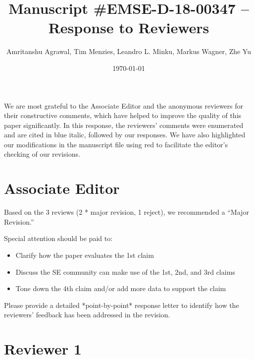 \documentclass{article}
\title{Manuscript \#EMSE-D-18-00347 -- Response to Reviewers}
\author{Amritanshu Agrawal, Tim Menzies, Leandro L. Minku, Markus Wagner, Zhe Yu}
\date{\today}
\newenvironment{com}{\color{blue}\begin{itshape}}{\end{itshape}\vspace{1ex}}
\begin{document}
\maketitle

We are most grateful to the Associate Editor and the anonymous reviewers for their constructive comments, which have helped to improve the quality of this paper significantly. In this response, the reviewers' comments were enumerated and are cited in blue italic, followed by our responses. We have also highlighted our modifications in the manuscript file using red to facilitate the editor's checking of our revisions. 


\section*{Associate Editor}
\label{sec:AE}

\begin{com}
Based on the 3 reviews (2 * major revision, 1 reject), we recommended a ``Major Revision.''

Special attention should be paid to:
\begin{itemize}
    \item Clarify how the paper evaluates the 1st claim
    \item Discuss the SE community can make use of the 1st, 2nd, and 3rd claims
    \item Tone down the 4th claim and/or add more data to support the claim
\end{itemize}

Please provide a detailed *point-by-point* response letter to identify how the reviewers' feedback has been addressed in the revision.
\end{com}



\section*{Reviewer 1}
\label{sec:Reviewer1}
\renewcommand*{\theenumi}{1.\arabic{enumi}}
\renewcommand*{\theenumii}{\theenumi.\arabic{enumii}}
\end{document}
